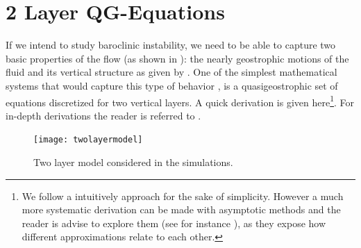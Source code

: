 \section{2 Layer QG-Equations}
\label{s:qg}

If we intend to study baroclinic instability, we need to be able to
capture two basic properties of the flow (as shown in
): the nearly geostrophic motions of the fluid and
its vertical structure as given by . One of
the simplest mathematical systems that would capture this type of
behavior , is a quasigeostrophic set of equations
discretized for two vertical layers. A quick derivation is given
here\footnote{
    We follow a intuitively approach for the sake of simplicity. However
    a much more systematic derivation can be made with asymptotic methods
    and the reader is advise to explore them (see for instance
    ), as they expose how different
    approximations relate to each other.
}. For in-depth derivations the  reader is referred to
.

\begin{figure}[t]
\begin{center}
    \texttt{[image: twolayermodel]}
\end{center}
\caption{Two layer model considered in the simulations.}
\label{f:twolayer}
\end{figure}

